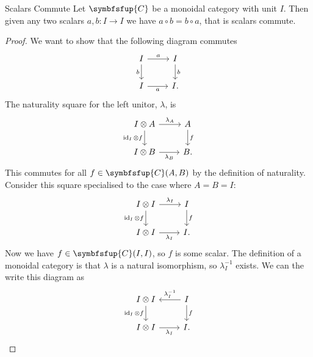 \documentclass[fleqn]{NotesClass}
\newcommand{\cat}[1]{\symbfsfup{#1}}
\DeclareMathOperator{\id}{id}
\begin{document}
    \begin{lma}{Scalars Commute}{}
        Let \(\cat{C}\) be a monoidal category with unit \(I\).
        Then given any two scalars \(a, b \colon I \to I\) we have \(a \circ b = b \circ a\), that is scalars commute.
        \begin{proof}
            We want to show that the following diagram commutes
            \begin{equation}
                \begin{tikzcd}
                    I \arrow[r, "a"] \arrow[d, "b"'] & I \arrow[d, "b"]\\
                    I \arrow[r, "a"'] & I.
                \end{tikzcd}
            \end{equation}
            The naturality square for the left unitor, \(\lambda\), is
            \begin{equation}
                \begin{tikzcd}
                    I \otimes A \arrow[r, "\lambda_A"] \arrow[d, "\id_I \otimes f"'] & A \arrow[d, "f"]\\
                    I \otimes B \arrow[r, "\lambda_B"'] & B.
                \end{tikzcd}
            \end{equation}
            This commutes for all \(f \in \cat{C}(A, B)\) by the definition of naturality.
            Consider this square specialised to the case where \(A = B = I\):
            \begin{equation}
                \begin{tikzcd}
                    I \otimes I \arrow[r, "\lambda_I"] \arrow[d, "\id_I \otimes f"'] & I \arrow[d, "f"]\\
                    I \otimes I \arrow[r, "\lambda_I"'] & I.
                \end{tikzcd}
            \end{equation}
            Now we have \(f \in \cat{C}(I, I)\), so \(f\) is some scalar.
            The definition of a monoidal category is that \(\lambda\) is a natural isomorphism, so \(\lambda_I^{-1}\) exists.
            We can the write this diagram as
            \begin{equation}
                \begin{tikzcd}
                    I \otimes I \arrow[d, "\id_I \otimes f"'] & I \arrow[l, "\lambda_I^{-1}"'] \arrow[d, "f"]\\
                    I \otimes I \arrow[r, "\lambda_I"'] & I.

\end{tikzcd}
\end{equation}
\end{proof}
\end{lma}
\end{document}
